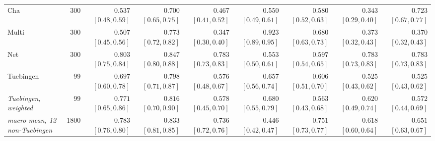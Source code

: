 {\begin{tabular}{l r rrrrrrr}
Cha & 300 & $0.537$ {\tiny$[0.48,0.59]$} & $0.700$ {\tiny$[0.65,0.75]$} & $0.467$ {\tiny$[0.41,0.52]$} & $0.550$ {\tiny$[0.49,0.61]$} & $0.580$ {\tiny$[0.52,0.63]$} & $0.343$ {\tiny$[0.29,0.40]$} & $0.723$ {\tiny$[0.67,0.77]$}\\
Multi & 300 & $0.507$ {\tiny$[0.45,0.56]$} & $0.773$ {\tiny$[0.72,0.82]$} & $0.347$ {\tiny$[0.30,0.40]$} & $0.923$ {\tiny$[0.89,0.95]$} & $0.680$ {\tiny$[0.63,0.73]$} & $0.373$ {\tiny$[0.32,0.43]$} & $0.370$ {\tiny$[0.32,0.43]$}\\
Net & 300 & $0.803$ {\tiny$[0.75,0.84]$} & $0.847$ {\tiny$[0.80,0.88]$} & $0.783$ {\tiny$[0.73,0.83]$} & $0.553$ {\tiny$[0.50,0.61]$} & $0.597$ {\tiny$[0.54,0.65]$} & $0.783$ {\tiny$[0.73,0.83]$} & $0.783$ {\tiny$[0.73,0.83]$}\\
Tuebingen & 99 & $0.697$ {\tiny$[0.60,0.78]$} & $0.798$ {\tiny$[0.71,0.87]$} & $0.576$ {\tiny$[0.48,0.67]$} & $0.657$ {\tiny$[0.56,0.74]$} & $0.606$ {\tiny$[0.51,0.70]$} & $0.525$ {\tiny$[0.43,0.62]$} & $0.525$ {\tiny$[0.43,0.62]$}\\
\midrule
\emph{Tuebingen, weighted} & 99 & $0.771$ {\tiny$[0.65,0.86]$} & $0.816$ {\tiny$[0.70,0.90]$} & $0.578$ {\tiny$[0.45,0.70]$} & $0.680$ {\tiny$[0.55,0.79]$} & $0.563$ {\tiny$[0.43,0.68]$} & $0.620$ {\tiny$[0.49,0.74]$} & $0.572$ {\tiny$[0.44,0.69]$}\\
\midrule
\emph{macro mean, 12 non-Tuebingen} & 1800 & $0.783$ {\tiny$[0.76,0.80]$} & $0.833$ {\tiny$[0.81,0.85]$} & $0.736$ {\tiny$[0.72,0.76]$} & $0.446$ {\tiny$[0.42,0.47]$} & $0.751$ {\tiny$[0.73,0.77]$} & $0.618$ {\tiny$[0.60,0.64]$} & $0.651$ {\tiny$[0.63,0.67]$}\\
\bottomrule
\end{tabular}}

